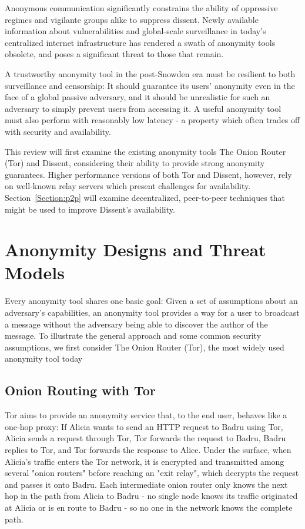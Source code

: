Anonymous communication significantly constrains the ability of oppressive
regimes and vigilante groups alike to suppress dissent. Newly available
information about vulnerabilities and global-scale surveillance in today's
centralized internet infrastructure has rendered a swath of anonymity tools
obsolete, and poses a significant threat to those that remain.

A trustworthy anonymity tool in the post-Snowden era must be resilient to both
surveillance and censorship: It should guarantee its users' anonymity even in
the face of a global passive adversary, and it should be unrealistic for such an
adversary to simply prevent users from accessing it. A useful anonymity tool
must also perform with reasonably low latency - a property which often trades
off with security and availability.

This review will first examine the existing anonymity tools The Onion Router
(Tor) and Dissent, considering their ability to provide strong anonymity
guarantees. Higher performance versions of both Tor and Dissent, however, rely
on well-known relay servers which present challenges for availability.
Section~\ref{Section:p2p} will examine decentralized, peer-to-peer techniques
that might be used to improve Dissent's availability.

\section{Anonymity Designs and Threat Models}
\label{Section:ExistingAnonymity}
  Every anonymity tool shares one basic goal: Given a set of assumptions about
  an adversary's capabilities, an anonymity tool provides a way for a user to
  broadcast a message without the adversary being able to discover the author of
  the message.
  To illustrate the general approach and some common security assumptions, we
  first consider The Onion Router (Tor), the most widely used anonymity tool
  today\cite{ford_hiding_2014}

  \subsection{Onion Routing with Tor}
  \label{Subsection:Tor}
    Tor aims to provide an anonymity service that, to the end user, behaves like
    a one-hop proxy: If Alicia wants to send an HTTP request to Badru using Tor,
    Alicia sends a request through Tor, Tor forwards the request to Badru, Badru
    replies to Tor, and Tor forwards the response to Alice. Under the surface,
    when Alicia's traffic enters the Tor network, it is encrypted and
    transmitted among several "onion routers" before reaching an "exit relay",
    which decrypts the request and passes it onto Badru. Each intermediate onion
    router only knows the next hop in the path from Alicia to Badru - no single
    node knows its traffic originated at Alicia or is en route to Badru - so no
    one in the network knows the complete path.

